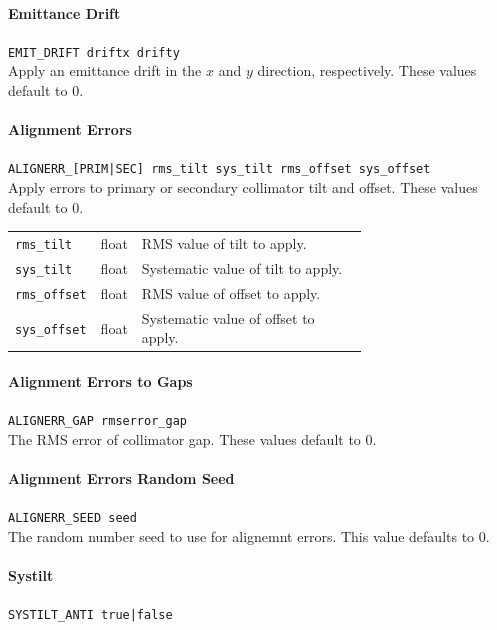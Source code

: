 \paragraph{Emittance Drift} \texttt{EMIT\_DRIFT driftx drifty}\\

Apply an emittance drift in the $x$ and $y$ direction, respectively.
These values default to 0.

\paragraph{Alignment Errors} \texttt{ALIGNERR\_[PRIM|SEC] rms\_tilt sys\_tilt rms\_offset sys\_offset}\\

Apply errors to primary or secondary collimator tilt and offset.
These values default to 0.

\bigskip
\begin{tabular}{@{}llp{0.7\linewidth}}
    \texttt{rms\_tilt}   & float & RMS value of tilt to apply. \\
    \texttt{sys\_tilt}   & float & Systematic value of tilt to apply. \\
    \texttt{rms\_offset} & float & RMS value of offset to apply. \\
    \texttt{sys\_offset} & float & Systematic value of offset to apply.
\end{tabular}

\paragraph{Alignment Errors to Gaps} \texttt{ALIGNERR\_GAP rmserror\_gap}\\

The RMS error of collimator gap.
These values default to 0.

\paragraph{Alignment Errors Random Seed} \texttt{ALIGNERR\_SEED seed}\\

The random number seed to use for alignemnt errors.
This value defaults to 0.

\paragraph{Systilt} \texttt{SYSTILT\_ANTI true|false}\\

